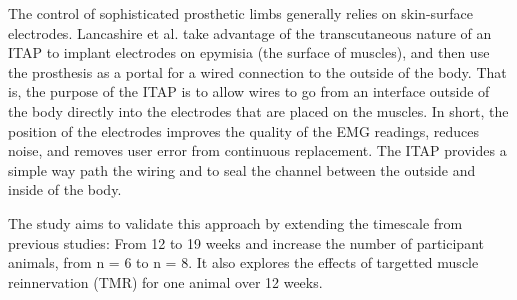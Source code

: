 The control of sophisticated prosthetic limbs generally relies on skin-surface electrodes.
Lancashire et al. take advantage of the transcutaneous nature of an ITAP to implant electrodes on epymisia (the surface of muscles), and then use the prosthesis as a portal for a wired connection to the outside of the body.
That is, the purpose of the ITAP is to allow wires to go from an interface outside of the body directly into the electrodes that are placed on the muscles.
In short, the position of the electrodes improves the quality of the EMG readings, reduces noise, and removes user error from continuous replacement.
The ITAP provides a simple way path the wiring and to seal the channel between the outside and inside of the body.

The study aims to validate this approach by extending the timescale from previous studies: From 12 to 19 weeks and increase the number of participant animals, from n = 6 to n = 8.
It also explores the effects of targetted muscle reinnervation (TMR) for one animal over 12 weeks.